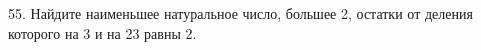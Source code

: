 55. Найдите наименьшее натуральное число, большее 2, остатки от деления которого на 3 и на 23 равны 2.\\
